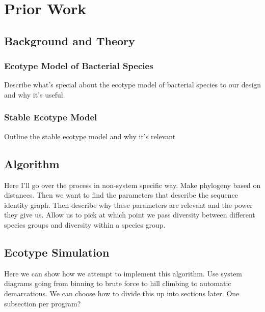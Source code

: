 \chapter{Prior Work}
\section{Background and Theory}
\subsection{Ecotype Model of Bacterial Species}
Describe what's special about the ecotype model of bacterial species to our design and why it's useful.
\subsection{Stable Ecotype Model}
Outline the stable ecotype model and why it's relevant
\section{Algorithm}
Here I'll go over the process in non-system specific way. Make phylogeny based on distances. Then we want to find the parameters that describe the sequence identity graph. Then describe why these parameters are relevant and the power they give us. Allow us to pick at which point we pass diversity between different species groups and diversity within a species group.
\section{Ecotype Simulation}
Here we can show how we attempt to implement this algorithm. Use system diagrams going from binning to brute force to hill climbing to automatic demarcations. We can choose how to divide this up into sections later. One subsection per program?